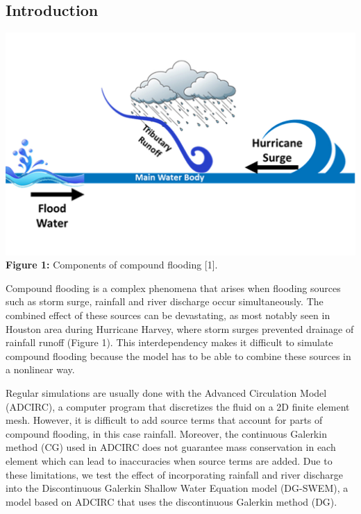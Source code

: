 \documentclass[american]{article}
\begin{document}

\hrulefill
\vspace{10mm}
\fontsize{30}{36}\selectfont
\setlength{\columnsep}{1cm}
\vspace{-1.00cm}
\begin{multicols}{3}
\noindent

\section*{Introduction}

\begin{center}
  \vspace{5mm}
  \includegraphics[width=0.85\linewidth]{media/compound_flooding.jpg} \\
  \textbf{Figure 1:} Components of compound flooding [1].
\end{center}
Compound flooding is a complex phenomena that arises when flooding sources such as storm surge, rainfall and river discharge occur simultaneously. The combined effect of these sources can be devastating, as most notably seen in Houston area during Hurricane Harvey, where storm surges prevented drainage of rainfall runoff (Figure 1). This interdependency makes it difficult to simulate compound flooding because the model has to be able to combine these sources in a nonlinear way.

Regular simulations are usually done with the Advanced Circulation Model (ADCIRC), a computer program that discretizes the fluid on a 2D finite element mesh. However, it is difficult to add source terms that account for parts of compound flooding, in this case rainfall. Moreover, the continuous Galerkin method (CG) used in ADCIRC does not guarantee mass conservation in each element which can lead to inaccuracies when source terms are added.
Due to these limitations, we test the effect of incorporating rainfall and river discharge into the Discontinuous Galerkin Shallow Water Equation model (DG-SWEM), a model based on ADCIRC that uses the discontinuous Galerkin method (DG).


\end{multicols}
\end{document}
